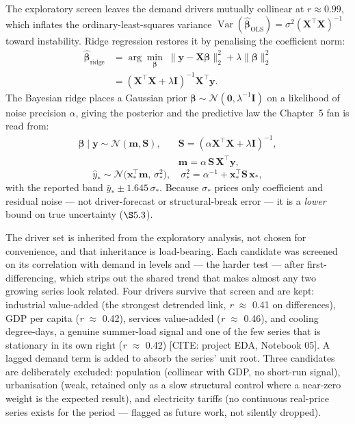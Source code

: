 \documentclass[10pt,twocolumn]{article}
\newcommand{\mk}[1]{{\color{amber}\small #1}}
\begin{document}
\noindent The exploratory screen leaves the demand drivers mutually collinear at
$r\approx0.99$, which inflates the ordinary-least-squares variance
$\operatorname{Var}(\hat{\boldsymbol\beta}_{\mathrm{OLS}})=\sigma^2(\mathbf{X}^\top\mathbf{X})^{-1}$
toward instability. Ridge regression restores it by penalising the coefficient
norm:
\begin{equation}
\begin{aligned}
\hat{\boldsymbol\beta}_{\mathrm{ridge}}
   &=\arg\min_{\boldsymbol\beta}\;
   \bigl\lVert\mathbf{y}-\mathbf{X}\boldsymbol\beta\bigr\rVert_2^{2}
   +\lambda\lVert\boldsymbol\beta\rVert_2^{2}\\
   &=(\mathbf{X}^\top\mathbf{X}+\lambda\mathbf{I})^{-1}\mathbf{X}^\top\mathbf{y}.
\end{aligned}
\label{eq:ridge}
\end{equation}
The Bayesian ridge places a Gaussian prior $\boldsymbol\beta\sim\mathcal{N}(\mathbf{0},\lambda^{-1}\mathbf{I})$
on a likelihood of noise precision $\alpha$, giving the posterior and the
predictive law the Chapter~5 fan is read from:
\begin{equation}
\begin{aligned}
\boldsymbol\beta\mid\mathbf{y}\sim\mathcal{N}(\mathbf{m},\mathbf{S}),\quad
&\mathbf{S}=(\alpha\mathbf{X}^\top\mathbf{X}+\lambda\mathbf{I})^{-1},\\
&\mathbf{m}=\alpha\,\mathbf{S}\,\mathbf{X}^\top\mathbf{y},
\end{aligned}
\label{eq:bridge}
\end{equation}
\begin{equation}
\hat y_\ast\sim\mathcal{N}\!\bigl(\mathbf{x}_\ast^\top\mathbf{m},\,\sigma_\ast^{2}\bigr),
\quad
\sigma_\ast^{2}=\alpha^{-1}+\mathbf{x}_\ast^\top\mathbf{S}\,\mathbf{x}_\ast,
\label{eq:pred}
\end{equation}
with the reported band $\hat y_\ast\pm1.645\,\sigma_\ast$. Because $\sigma_\ast$
prices only coefficient and residual noise --- not driver-forecast or
structural-break error --- it is a \emph{lower} bound on true uncertainty
($\S5.3$).

The driver set is inherited from the exploratory analysis, not chosen for convenience, and that inheritance is load-bearing. Each candidate was screened on its correlation with demand in levels and --- the harder test --- after first-differencing, which strips out the shared trend that makes almost any two growing series look related. Four drivers survive that screen and are kept: industrial value-added (the strongest detrended link, \textit{r} $\approx$ 0.41 on differences), GDP per capita (\textit{r} $\approx$ 0.42), services value-added (\textit{r} $\approx$ 0.46), and cooling degree-days, a genuine summer-load signal and one of the few series that is stationary in its own right (\textit{r} $\approx$ 0.42) \mk{[CITE: project EDA, Notebook 05]}. A lagged demand term is added to absorb the series' unit root. Three candidates are deliberately excluded: population (collinear with GDP, no short-run signal), urbanisation (weak, retained only as a slow structural control where a near-zero weight is the expected result), and electricity tariffs (no continuous real-price series exists for the period --- flagged as future work, not silently dropped).
\end{document}
